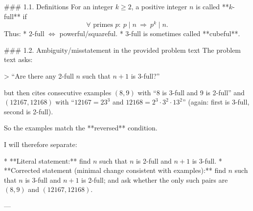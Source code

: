 ### 1.1. Definitions
For an integer \(k\ge 2\), a positive integer \(n\) is called **\(k\)-full** if
\[
\forall\text{ primes }p:\ p\mid n\ \Rightarrow\ p^k\mid n.
\]
Thus:
* \(2\)-full \(\Leftrightarrow\) powerful/squareful.
* \(3\)-full is sometimes called **cubeful**.

### 1.2. Ambiguity/misstatement in the provided problem text
The problem text asks:

> “Are there any 2-full \(n\) such that \(n+1\) is 3-full?”

but then cites consecutive examples \((8,9)\) with “8 is 3-full and 9 is 2-full” and
\((12167,12168)\) with “\(12167=23^3\) and \(12168=2^3\cdot 3^2\cdot 13^2\)” (again: first is 3-full,
second is 2-full).

So the examples match the **reversed** condition.

I will therefore separate:

* **Literal statement:** find \(n\) such that \(n\) is 2-full and \(n+1\) is 3-full.
* **Corrected statement (minimal change consistent with examples):** find \(n\) such that \(n\) is
  3-full and \(n+1\) is 2-full; and ask whether the only such pairs are \((8,9)\) and
  \((12167,12168)\).

---
